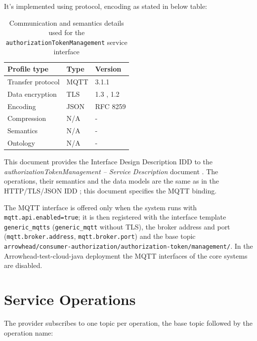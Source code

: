 \documentclass[a4paper]{arrowhead}
\begin{document}
It's implemented using protocol, encoding as stated in below table:
\begin{table}[ht!]
  \centering
  \begin{tabular}{|l|l|l|}
    \hline
    \rowcolor{gray!33} Profile type & Type & Version \\ \hline
    Transfer protocol & MQTT & 3.1.1 \cite{mqtt311} \\ \hline
    Data encryption & TLS & 1.3 \cite{rfc8446}, 1.2 \cite{rfc5246} \\ \hline
    Encoding & JSON & RFC 8259 \cite{rfc8259} \\ \hline
    Compression & N/A & - \\ \hline
    Semantics & N/A & - \\ \hline
    Ontology & N/A & - \\ \hline
  \end{tabular}
  \caption{Communication and semantics details used for the \texttt{authorization\allowbreak{}Token\allowbreak{}Management} service interface}
  \label{tab:comunication_semantics_profile}
\end{table}

This document provides the Interface Design Description IDD to the \textit{authorizationTokenManagement -- Service Description} document \cite{ca-authorizationTokenManagement-sd}.
The operations, their semantics and the data models are the same as in the HTTP/TLS/JSON IDD \cite{ca-authorizationTokenManagement-http-idd}; this document specifies the MQTT binding.

The MQTT interface is offered only when the system runs with \texttt{mqtt.api.enabled=true}; it is then registered with the interface template \texttt{generic\_\allowbreak{}mqtts} (\texttt{generic\_\allowbreak{}mqtt} without TLS), the broker address and port (\texttt{mqtt.\allowbreak{}broker.\allowbreak{}address}, \texttt{mqtt.\allowbreak{}broker.\allowbreak{}port}) and the base topic \texttt{arrowhead/\allowbreak{}consumer-\allowbreak{}authorization/\allowbreak{}authorization-\allowbreak{}token/\allowbreak{}management/\allowbreak{}}. In the Arrowhead-test-cloud-java deployment the MQTT interfaces of the core systems are disabled.

\newpage

\section{Service Operations}
\label{sec:operations}

The provider subscribes to one topic per operation, the base topic followed by the operation name:
\end{document}
